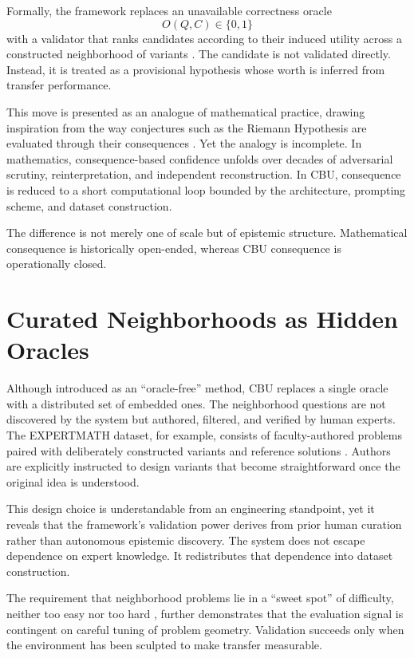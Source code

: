 \documentclass[12pt]{article}
\begin{document}
Formally, the framework replaces an unavailable correctness oracle
\[
O(Q,C)\in\{0,1\}
\]
with a validator that ranks candidates according to their induced utility across a constructed neighborhood of variants \citep{son2026}. The candidate is not validated directly. Instead, it is treated as a provisional hypothesis whose worth is inferred from transfer performance.

This move is presented as an analogue of mathematical practice, drawing inspiration from the way conjectures such as the Riemann Hypothesis are evaluated through their consequences \citep{son2026}. Yet the analogy is incomplete. In mathematics, consequence-based confidence unfolds over decades of adversarial scrutiny, reinterpretation, and independent reconstruction. In CBU, consequence is reduced to a short computational loop bounded by the architecture, prompting scheme, and dataset construction.

The difference is not merely one of scale but of epistemic structure. Mathematical consequence is historically open-ended, whereas CBU consequence is operationally closed.

\section{Curated Neighborhoods as Hidden Oracles}

Although introduced as an ``oracle-free'' method, CBU replaces a single oracle with a distributed set of embedded ones. The neighborhood questions are not discovered by the system but authored, filtered, and verified by human experts. The EXPERTMATH dataset, for example, consists of faculty-authored problems paired with deliberately constructed variants and reference solutions \citep{son2026}. Authors are explicitly instructed to design variants that become straightforward once the original idea is understood.

This design choice is understandable from an engineering standpoint, yet it reveals that the framework's validation power derives from prior human curation rather than autonomous epistemic discovery. The system does not escape dependence on expert knowledge. It redistributes that dependence into dataset construction.

The requirement that neighborhood problems lie in a ``sweet spot'' of difficulty, neither too easy nor too hard \citep{son2026}, further demonstrates that the evaluation signal is contingent on careful tuning of problem geometry. Validation succeeds only when the environment has been sculpted to make transfer measurable.
\end{document}
